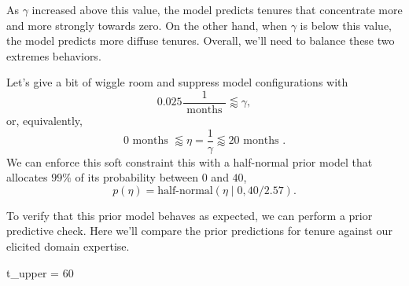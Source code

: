 \documentclass[
  letterpaper,
  DIV=11,
  numbers=noendperiod]{scrartcl}
\newenvironment{Shaded}{\begin{snugshade}}{\end{snugshade}}
\newcommand{\DecValTok}[1]{\textcolor[rgb]{0.68,0.00,0.00}{#1}}
\newcommand{\NormalTok}[1]{\textcolor[rgb]{0.00,0.23,0.31}{#1}}
\newcommand{\OperatorTok}[1]{\textcolor[rgb]{0.37,0.37,0.37}{#1}}
\begin{document}
As \(\gamma\) increased above this value, the model predicts tenures
that concentrate more and more strongly towards zero. On the other hand,
when \(\gamma\) is below this value, the model predicts more diffuse
tenures. Overall, we'll need to balance these two extremes behaviors.

Let's give a bit of wiggle room and suppress model configurations with
\[
0.025 \frac{ 1 }{ \text{ months } } \lessapprox \gamma,
\] or, equivalently, \[
0 \text{ months } \lessapprox
\eta = \frac{1}{\gamma} \lessapprox
20 \text{ months }.
\] We can enforce this soft constraint this with a half-normal prior
model that allocates \(99\%\) of its probability between \(0\) and
\(40\), \[
p( \eta ) = \text{half-normal}( \eta \mid 0, 40 / 2.57 ).
\]

To verify that this prior model behaves as expected, we can perform a
prior predictive check. Here we'll compare the prior predictions for
tenure against our elicited domain expertise.

\begin{Shaded}
\begin{Highlighting}[]
\NormalTok{t\_upper }\OperatorTok{=} \DecValTok{60}
\end{Highlighting}
\end{Shaded}
\end{document}

